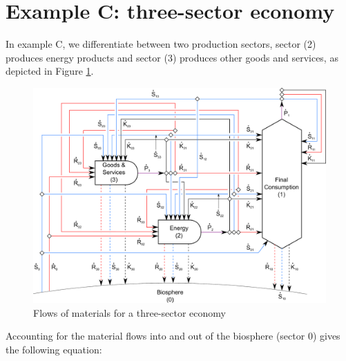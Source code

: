 %
%

\section{Example C: three-sector economy} %
\label{sec:C_materials}

In example C, we differentiate between two production sectors, sector (2) produces energy
products and sector (3) produces other goods and services, as depicted in Figure
\ref{fig:C_materials}.

\begin{figure}[!ht]
\centering
\includegraphics[width=0.8\linewidth]{Part_1/Chapter_Materials/images/3_sector_materials.pdf}
\caption[Flows of materials for a three-sector economy]{Flows of materials for a three-sector economy}
\label{fig:C_materials}
\end{figure}

Accounting for the material flows into and out of the biosphere (sector 0) gives the following equation:

